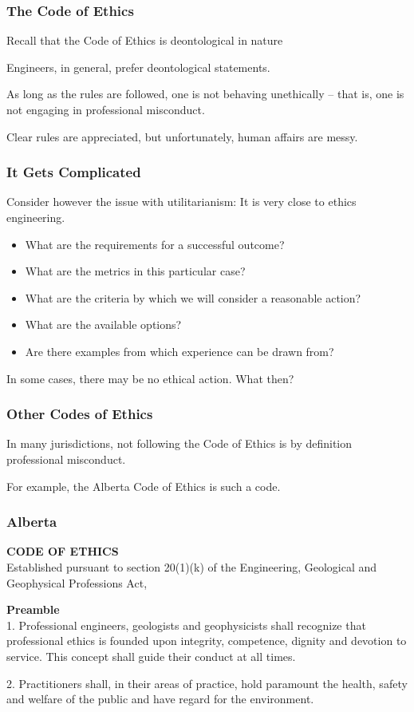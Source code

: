 \begin{frame}
\frametitle{The Code of Ethics}

Recall that the Code of Ethics is deontological in nature

Engineers, in general, prefer deontological statements. 

As long as the rules are followed, one is not behaving unethically -- that is, one is not engaging in professional misconduct.

Clear rules are appreciated, but unfortunately, human affairs are messy.


\end{frame}



\begin{frame}
\frametitle{It Gets Complicated}

Consider however the issue with utilitarianism: It is very close to ethics engineering.

\begin{itemize}
\item What are the requirements for a successful outcome?
\item What are the metrics in this particular case?
\item What are the criteria by which we will consider a reasonable action?
\item What are the available options?
\item Are there examples from which experience can be drawn from?
\end{itemize}

In some cases, there may be no ethical action. What then?

\end{frame}



\begin{frame}
\frametitle{Other Codes of Ethics}

In many jurisdictions, not following the Code of Ethics is by definition professional misconduct.


For example, the Alberta Code of Ethics is such a code.

\end{frame}



\begin{frame}
\frametitle{Alberta}

\textbf{CODE OF ETHICS}\\
\quad Established pursuant to section 20(1)(k) of the Engineering, Geological and Geophysical Professions Act,

\textbf{Preamble}\\
1. Professional engineers, geologists and geophysicists shall recognize that professional ethics is founded upon integrity, competence, dignity and devotion to service. This concept shall guide their conduct at all times.

2. Practitioners shall, in their areas of practice, hold paramount the health, safety and welfare of the public and have regard for the environment.


\end{frame}




